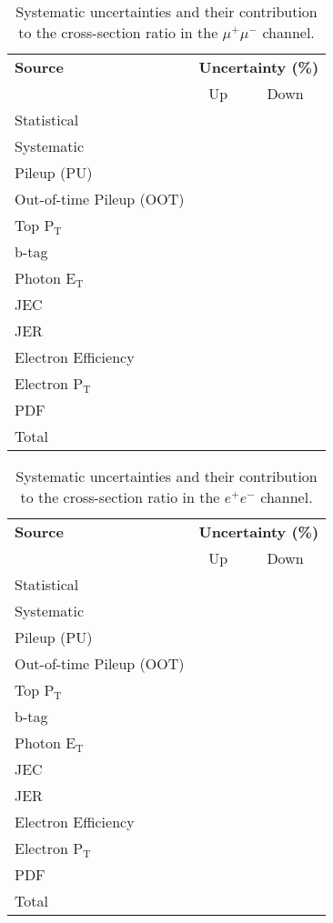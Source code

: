 \begin{table}[h!] 
\centering
\begin{tabular}{|l|c|c|}
\hline
\textbf{Source} & \multicolumn{2}{c|}{\textbf{Uncertainty (\%)}} \\ \cline{2-3}
 & Up & Down \\
\hline
Statistical & & \\
\hline
Systematic & & \\
\hline
Pileup (PU) & & \\
Out-of-time Pileup (OOT) & & \\
Top P$_{\text{T}}$ & & \\
b-tag & & \\
Photon E$_{\text{T}}$ & & \\
JEC & & \\
JER & & \\
Electron Efficiency & & \\
Electron P$_{\text{T}}$ & & \\
PDF & & \\
\hline
Total & & \\
\hline
\end{tabular} 
\caption{Systematic uncertainties and their contribution to the cross-section ratio in the $\mu^+\mu^-$ channel.}
\label{tab-systuncertsMuMu}
\end{table}

\begin{table}[h!] 
\centering
\begin{tabular}{|l|c|c|}
\hline
\textbf{Source} & \multicolumn{2}{c|}{\textbf{Uncertainty (\%)}} \\ \cline{2-3}
 & Up & Down \\
\hline
Statistical & & \\
\hline
Systematic & & \\
\hline
Pileup (PU) & & \\
Out-of-time Pileup (OOT) & & \\
Top P$_{\text{T}}$ & & \\
b-tag & & \\
Photon E$_{\text{T}}$ & & \\
JEC & & \\
JER & & \\
Electron Efficiency & & \\
Electron P$_{\text{T}}$ & & \\
PDF & & \\
\hline
Total & & \\
\hline
\end{tabular} 
\caption{Systematic uncertainties and their contribution to the cross-section ratio in the $e^+e^-$ channel.}
\label{tab-systuncertsEE}
\end{table}

